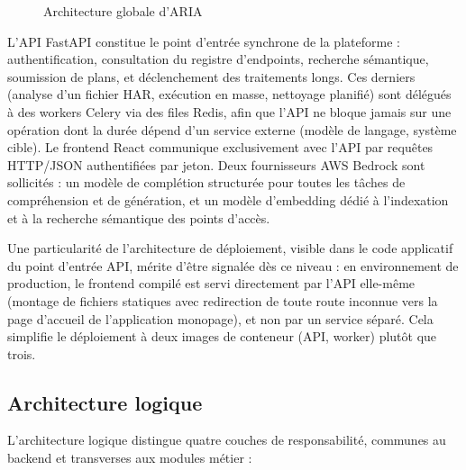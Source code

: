 \begin{figure}[H]
  \centering
  \caption{Architecture globale d'ARIA}
  \label{fig:archi-globale}
\end{figure}

L'API FastAPI constitue le point d'entrée synchrone de la plateforme : authentification, consultation du registre d'endpoints, recherche sémantique, soumission de plans, et déclenchement des traitements longs. Ces derniers (analyse d'un fichier HAR, exécution en masse, nettoyage planifié) sont délégués à des workers Celery via des files Redis, afin que l'API ne bloque jamais sur une opération dont la durée dépend d'un service externe (modèle de langage, système cible). Le frontend React communique exclusivement avec l'API par requêtes HTTP/JSON authentifiées par jeton. Deux fournisseurs AWS Bedrock sont sollicités : un modèle de complétion structurée pour toutes les tâches de compréhension et de génération, et un modèle d'embedding dédié à l'indexation et à la recherche sémantique des points d'accès.

Une particularité de l'architecture de déploiement, visible dans le code applicatif du point d'entrée API, mérite d'être signalée dès ce niveau : en environnement de production, le frontend compilé est servi directement par l'API elle-même (montage de fichiers statiques avec redirection de toute route inconnue vers la page d'accueil de l'application monopage), et non par un service séparé. Cela simplifie le déploiement à deux images de conteneur (API, worker) plutôt que trois.

\subsection{Architecture logique}

L'architecture logique distingue quatre couches de responsabilité, communes au backend et transverses aux modules métier :

